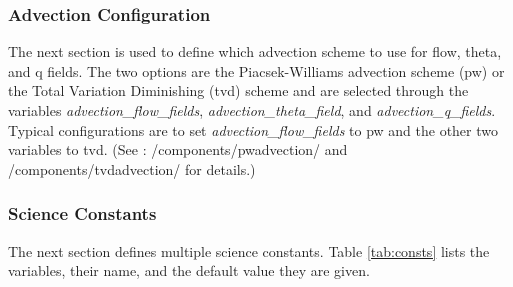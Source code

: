 \subsubsection{Advection Configuration}
The next section is used to define which advection scheme to use for flow, theta, and q fields. The two options are the Piacsek-Williams advection scheme (pw) or the Total Variation Diminishing (tvd) scheme and are selected through the variables \textit{advection\_flow\_fields}, \textit{advection\_theta\_field}, and \textit{advection\_q\_fields}. Typical configurations are to set \textit{advection\_flow\_fields} to pw and the other two variables to tvd. (See \cite{moncCode}: /components/pwadvection/ and /components/tvdadvection/ for details.)
\newpage
\subsubsection{Science Constants}
The next section defines multiple science constants. Table \ref{tab:consts} lists the variables, their name, and the default value they are given. \citep{moncCode}

